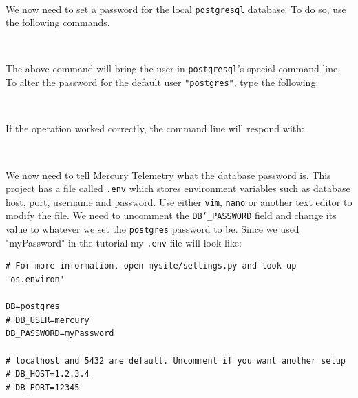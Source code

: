 \documentclass[12pt, letterpaper]{article}
\begin{document}
{{{{{{{\par{}
\par{} 
\\[0.25\baselineskip]

\par We now need to set a password for the local \texttt{postgresql} database. To do so, use the following commands. 
\\[0.25\baselineskip]

\par{} \\[0.25\baselineskip]

\par The above command will bring the user in \texttt{postgresql}'s special command line. To alter the password for the default user \texttt{"postgres"}, type the following: \\[0.25\baselineskip]

\par{} \\[0.25\baselineskip]

\par If the operation worked correctly, the command line will respond with: \\[0.25\baselineskip]

\par{} \\[0.25\baselineskip]

\par We now need to tell Mercury Telemetry what the database password is. This project has a file called \texttt{.env} which stores environment variables such as database host, port, username and password. Use either \texttt{vim}, \texttt{nano} or another text editor to modify the file. We need to uncomment the \texttt{DB\char`_PASSWORD} field and change its value to whatever we set the \texttt{postgres} password to be. Since we used "myPassword" in the tutorial my \texttt{.env} file will look like:

\begin{verbatim}
# For more information, open mysite/settings.py and look up 'os.environ'

DB=postgres
# DB_USER=mercury
DB_PASSWORD=myPassword

# localhost and 5432 are default. Uncomment if you want another setup
# DB_HOST=1.2.3.4
# DB_PORT=12345
\end{verbatim}

}}}}}}}
\end{document}
